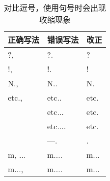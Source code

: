 \begin{table}
    \begin{center}
        \begin{tabular}{|l|||l|l|}
            \hline
            正确写法 & 错误写法 & 改正\\
            \hline
            ?, & ?. & ?\\
            !, & !. & !\\
            N., & N.. & N.\\
            etc., & etc.. & etc.\\
            & etc... & etc.\\
            & etc.... & etc. \\
            & ---. & .\\
            m, ... & m.... & m...\\
            m..., & m.... & m...\\
            \hline
        \end{tabular}
        \caption{对比逗号，使用句号时会出现收缩现象}
        \label{tab2}
    \end{center}
\end{table}

